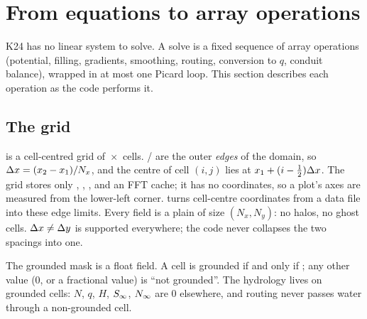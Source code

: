 \section{From equations to array operations}\label{sec:discretisation}

K24 has no linear system to solve. A solve is a fixed sequence of array operations (potential, filling, gradients,
smoothing, routing, conversion to $q$, conduit balance), wrapped in at most one Picard loop. This section describes
each operation as the code performs it.

\subsection{The grid}\label{disc:grid}
 is a cell-centred grid of \,$\times$\, cells.
/ are the outer \emph{edges} of the domain, so $\Delta x = (x_2 - x_1)/N_x$, and the centre of
cell $(i,j)$ lies at $x_1 + (i-\tfrac12)\Delta x$. The grid stores only , , ,  and an FFT
cache; it has no coordinates, so a plot's axes are measured from the lower-left corner. 
turns cell-centre coordinates from a data file into these edge limits. Every field is a plain
 of size $(N_x, N_y)$: no halos, no ghost cells. $\Delta x\ne\Delta y$ is supported everywhere; the code
never collapses the two spacings into one.

The grounded mask is a float field. A cell is grounded if and only if ; any other value
(0, or a fractional value) is ``not grounded''. The hydrology lives on grounded cells: $N$, $q$, $H$, ${S_\infty}$, ${N_\infty}$
are 0 elsewhere, and routing never passes water through a non-grounded cell.

